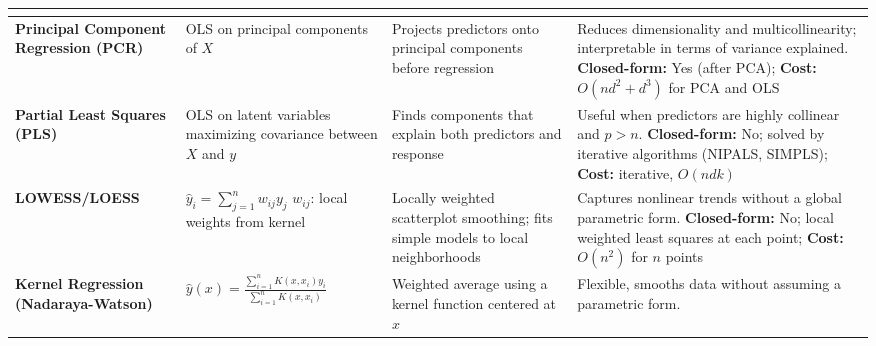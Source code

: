 \documentclass[10pt]{article}
\begin{document}
\begin{longtable}{|>{\bfseries}m{3cm}|m{5cm}|p{3.5cm}|p{8cm}|}
{		} \\
		\hline
		Principal Component Regression (PCR) & \parbox{5cm}{
				OLS on principal components of $X$
		} & \parbox{3.5cm}{\vspace{2pt}Projects predictors onto principal components before
		regression} & \parbox{8cm}{\vspace{2pt}
				Reduces dimensionality and multicollinearity; interpretable in terms of variance explained. \\
				\textbf{Closed-form:} Yes (after PCA); \\
				\textbf{Cost:} $O(nd^2 + d^3)$ for PCA and OLS
				\vspace{4pt}
		} \\
		\hline
		Partial Least Squares (PLS) & \parbox{5cm}{
				OLS on latent variables maximizing covariance between $X$ and $y$
		} & \parbox{3.5cm}{\vspace{2pt}Finds components that explain both predictors and
		response} & \parbox{8cm}{\vspace{2pt}
				Useful when predictors are highly collinear and $p > n$. \\
				\textbf{Closed-form:} No; solved by iterative algorithms (NIPALS, SIMPLS); \\
				\textbf{Cost:} iterative, $O(ndk)$
				\vspace{4pt}
		} \\
		\hline
		LOWESS/LOESS & \parbox{5cm}{
				$\hat{y}_i = \sum_{j=1}^n w_{ij} y_j$ \\
				$w_{ij}$: local weights from kernel
		} & \parbox{3.5cm}{\vspace{2pt}Locally weighted scatterplot smoothing; fits simple
		models to local neighborhoods} & \parbox{8cm}{\vspace{2pt}
				Captures nonlinear trends without a global parametric form. \\
				\textbf{Closed-form:} No; local weighted least squares at each point; \\
				\textbf{Cost:} $O(n^2)$ for $n$ points
				\vspace{4pt}
		} \\
		\hline
		Kernel Regression (Nadaraya-Watson) & \parbox{5cm}{
				$\hat{y}(x) = \frac{\sum_{i=1}^n K(x, x_i) y_i}{\sum_{i=1}^n K(x, x_i)}$
		} & \parbox{3.5cm}{\vspace{2pt}Weighted average using a kernel function centered at
		$x$} & \parbox{8cm}{\vspace{2pt}
				Flexible, smooths data without assuming a parametric form. \\
}
\end{longtable}
\end{document}
